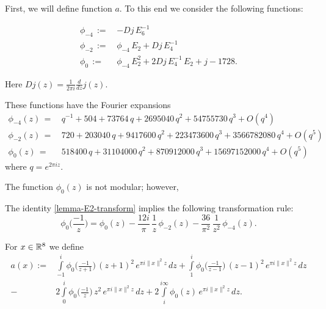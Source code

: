 First, we will define function $a$. To this end we consider the following functions:
\begin{definition}\label{def: phi4 phi2 phi0}
\begin{align}
  \phi_{-4}\,:= \,& -Dj\,E_6^{-1}\label{eqn: def phi4}\\
  \phi_{-2}\,:= \,&\phi_{-4}\,E_2+Dj\,E_4^{-1}\label{eqn: def phi2}\\
  \phi_{0}\,:= \,&\phi_{-4}\,E_2^2+2Dj\,E_4^{-1}\,E_2+j-1728.\label{eqn: def phi0}
\end{align}
\end{definition}
Here $Dj(z)=\frac{1}{2\pi i} \frac{d}{dz} j(z)$.
\begin{lemma}\label{lemma: phi fourier4 phi fourier2 phi fourier0}
  These functions have the Fourier expansions
\begin{align}
  \phi_{-4}(z)\,=\,&q^{-1} + 504 + 73764\, q + 2695040\, q^2 + 54755730\, q^3 + O(q^4)\label{eqn: phi fourier4}\\
  \phi_{-2}(z)\,=\,&720 + 203040\, q + 9417600\, q^2 + 223473600\, q^3 + 3566782080\, q^4+O(q^5)\label{eqn: phi fourier2}\\
  \phi_{0}(z)\,=\,&518400\, q + 31104000\, q^2 + 870912000\, q^3 + 15697152000\, q^4+O(q^5)\label{eqn: phi fourier0}
\end{align}
where $q=e^{2\pi i z}$.
\end{lemma}
The function $\phi_0(z)$ is not modular; however,
\begin{lemma}\label{lemma: phi0 transform}
  The identity \ref{lemma-E2-transform} implies the following transformation rule:
\begin{equation}\label{eqn: phi0 transform}
\phi_0\Big(\frac{-1}{z}\Big)=\phi_0(z)-\frac{12i}{\pi}\,\frac{1}{z}\,\phi_{-2}(z)-\frac{36}{\pi^2}\,\frac{1}{z^2}\,\phi_{-4}(z).
\end{equation}
\end{lemma}
\begin{definition}\label{def: a(r) definition}
For $x\in\mathbb{R}^8$ we define
\begin{align}\label{eqn: a(r) definition}
  a(x):=&\int\limits_{-1}^i\phi_0\Big(\frac{-1}{z+1}\Big)\,(z+1)^2\,e^{\pi i \|x\|^2 z}\,dz
  +\int\limits_{1}^i\phi_0\Big(\frac{-1}{z-1}\Big)\,(z-1)^2\,e^{\pi i \|x\|^2 z}\,dz\\
  -&2\int\limits_{0}^i\phi_0\Big(\frac{-1}{z}\Big)\,z^2\,e^{\pi i \|x\|^2 z}\,dz
  +2\int\limits_{i}^{i\infty}\phi_0(z)\,e^{\pi i \|x\|^2 z}\,dz.\nonumber
\end{align}
\end{definition}
